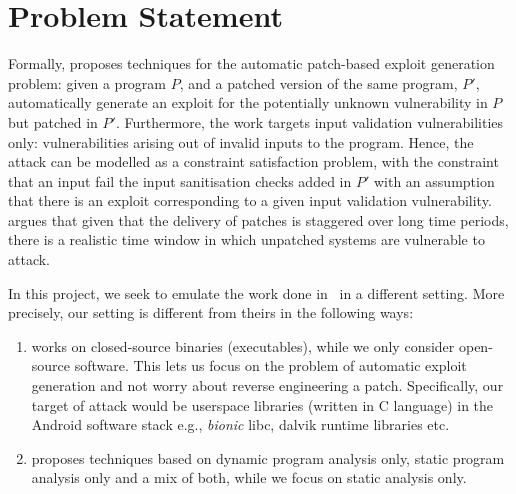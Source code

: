 \section{Problem Statement} \label{prob_st}
Formally, \ap proposes techniques for the automatic patch-based exploit generation problem: given a program $P$, and a patched version of the same program, $P'$, automatically generate an exploit for the potentially unknown vulnerability in $P$ but patched in $P'$. Furthermore, the work targets input validation vulnerabilities only: vulnerabilities arising out of invalid inputs to the program. Hence, the attack can be modelled as a constraint satisfaction problem, with the constraint that an input fail the input sanitisation checks added in $P'$ with an assumption that there is an exploit corresponding to a given input validation vulnerability. \ap argues that given that the delivery of patches is staggered over long time periods, there is a realistic time window in which unpatched systems are vulnerable to attack.

In this project, we seek to emulate the work done in~\cite{apeg08} in a different setting. More precisely, our setting is different from theirs in the following ways:
\begin{enumerate}
 \item \ap works on closed-source binaries (executables), while we only consider open-source software. This lets us focus on the problem of automatic exploit generation and not worry about reverse engineering a patch. Specifically, our target of attack would be userspace libraries (written in C language) in the Android software stack e.g., \textit{bionic} libc, dalvik runtime libraries etc.
 \item \ap proposes techniques based on dynamic program analysis only, static program analysis only and a mix of both, while we focus on static analysis only.
\end{enumerate}


